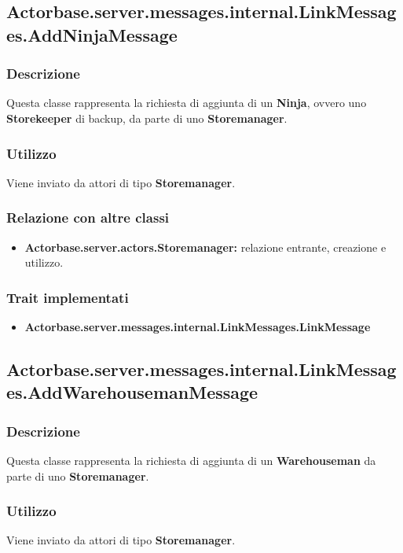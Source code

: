 \documentclass[a4paper]{article}
\begin{document}
		\subsection{Actorbase.server.messages.internal.LinkMessages.AddNinjaMessage}
			\subsubsection{Descrizione}
				Questa classe rappresenta la richiesta di aggiunta di un \textbf{Ninja}, ovvero uno \textbf{Storekeeper} di backup, da 
				parte di uno \textbf{Storemanager}.
				
			\subsubsection{Utilizzo}
				Viene inviato da attori di tipo \textbf{Storemanager}.
				
			\subsubsection{Relazione con altre classi}
				\begin{itemize}
					\item \textbf{Actorbase.server.actors.Storemanager:} relazione entrante, creazione e utilizzo.
				\end{itemize}
				
			\subsubsection{Trait implementati}
				\begin{itemize}
					\item \textbf{Actorbase.server.messages.internal.LinkMessages.LinkMessage} 
				\end{itemize}
				
		\subsection{Actorbase.server.messages.internal.LinkMessages.AddWarehousemanMessage}
			\subsubsection{Descrizione}
				Questa classe rappresenta la richiesta di aggiunta di un \textbf{Warehouseman} da 
				parte di uno \textbf{Storemanager}.
				
			\subsubsection{Utilizzo}
				Viene inviato da attori di tipo \textbf{Storemanager}.
				
\end{document}
